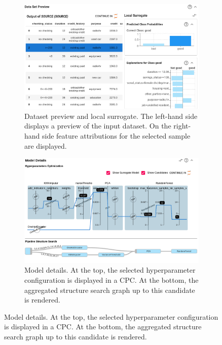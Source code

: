 \begin{figure}[htbp]
    \begin{subfigure}[t]{0.48\textwidth}
        \centering
        \includegraphics[width=\textwidth]{images/XAutoML c.png}
        \caption{Dataset preview and local surrogate. The left-hand side displays a preview of the input dataset. On the right-hand side feature attributions for the selected sample are displayed.}
        \label{fig:dataset_preview}
    \end{subfigure}
    \hfill
    \begin{subfigure}[t]{0.48\textwidth}
        \centering
        \includegraphics[width=\textwidth]{images/XAutoML d.png}
        \caption{Model details. At the top, the selected hyperparameter configuration is displayed in a CPC. At the bottom, the aggregated structure search graph up to this candidate is rendered.}
        \label{fig:model_details}
    \end{subfigure}
    
    \vspace{0.5cm}
    

\end{figure}
